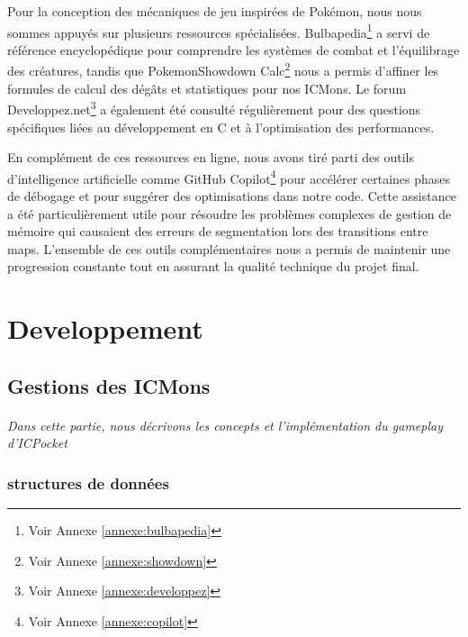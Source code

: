 \documentclass[12pt,a4paper, twoside]{article}
\begin{document}
Pour la conception des mécaniques de jeu inspirées de Pokémon, nous nous sommes appuyés sur plusieurs ressources spécialisées. Bulbapedia\footnote{Voir Annexe \ref{annexe:bulbapedia}} a servi de référence encyclopédique pour comprendre les systèmes de combat et l'équilibrage des créatures, tandis que PokemonShowdown Calc\footnote{Voir Annexe \ref{annexe:showdown}} nous a permis d'affiner les formules de calcul des dégâts et statistiques pour nos ICMons. Le forum Developpez.net\footnote{Voir Annexe \ref{annexe:developpez}} a également été consulté régulièrement pour des questions spécifiques liées au développement en C et à l'optimisation des performances.

En complément de ces ressources en ligne, nous avons tiré parti des outils d'intelligence artificielle comme GitHub Copilot\footnote{Voir Annexe \ref{annexe:copilot}} pour accélérer certaines phases de débogage et pour suggérer des optimisations dans notre code. Cette assistance a été particulièrement utile pour résoudre les problèmes complexes de gestion de mémoire qui causaient des erreurs de segmentation lors des transitions entre maps. L'ensemble de ces outils complémentaires nous a permis de maintenir une progression constante tout en assurant la qualité technique du projet final.
\newpage

\section{Developpement}
\subsection{Gestions des ICMons}
\paragraph{} \emph{Dans cette partie, nous décrivons les concepts et l'implémentation du gameplay d'ICPocket}
    \subsubsection{structures de données}
\end{document}
